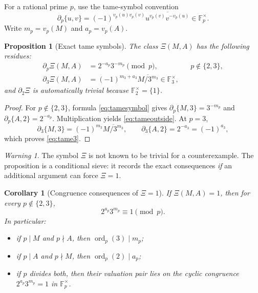 \documentclass[11pt]{article}
\numberwithin{equation}{section}
\newtheorem{proposition}[theorem]{Proposition}
\newtheorem{corollary}[theorem]{Corollary}
\theoremstyle{definition}
\theoremstyle{remark}
\newtheorem{warning}[theorem]{Warning}
\newcommand{\F}{\mathbb F}
\newcommand{\ord}{\operatorname{ord}}
\begin{document}
For a rational prime \(p\), use the tame-symbol convention
\begin{equation}
 \partial_p\{u,v\}
 =(-1)^{v_p(u)v_p(v)}
 \overline{u^{v_p(v)}v^{-v_p(u)}}
 \in\F_p^\times.\label{eq:tamesymbol}
\end{equation}
Write \(m_p=v_p(M)\) and \(a_p=v_p(A)\).

\begin{proposition}[Exact tame symbols]
\label{prop:tamesymbols}
The class \(\Xi(M,A)\) has the following residues:
\begin{align}
 \partial_p\Xi(M,A)
 &=2^{-a_p}3^{-m_p}\pmod p,
 &&p\notin\{2,3\},\label{eq:tameoutside}\\
 \partial_3\Xi(M,A)
 &=(-1)^{m_3+a_3}\overline{M/3^{m_3}}
 \in\F_3^\times,\label{eq:tame3}
\end{align}
and \(\partial_2\Xi\) is automatically trivial because \(\F_2^\times=\{1\}\).
\end{proposition}

\begin{proof}
For \(p\notin\{2,3\}\), formula \eqref{eq:tamesymbol} gives
\(\partial_p\{M,3\}=3^{-m_p}\) and
\(\partial_p\{A,2\}=2^{-a_p}\).  Multiplication yields
\eqref{eq:tameoutside}.  At \(p=3\),
\[
 \partial_3\{M,3\}=(-1)^{m_3}\overline{M/3^{m_3}},
 \qquad
 \partial_3\{A,2\}=2^{-a_3}=(-1)^{a_3},
\]
which proves \eqref{eq:tame3}.
\end{proof}

\begin{warning}
The symbol \(\Xi\) is not known to be trivial for a counterexample.  The proposition is a
conditional sieve: it records the exact consequences \emph{if} an additional argument can
force \(\Xi=1\).
\end{warning}

\begin{corollary}[Congruence consequences of \(\Xi=1\)]
\label{cor:K2sieve}
If \(\Xi(M,A)=1\), then for every \(p\notin\{2,3\}\),
\begin{equation}
 2^{a_p}3^{m_p}\equiv1\pmod p.\label{eq:K2congruence}
\end{equation}
In particular:
\begin{itemize}
\item if \(p\mid M\) and \(p\nmid A\), then \(\ord_p(3)\mid m_p\);
\item if \(p\mid A\) and \(p\nmid M\), then \(\ord_p(2)\mid a_p\);
\item if \(p\) divides both, then their valuation pair lies on the cyclic congruence
\(2^{a_p}3^{m_p}=1\) in \(\F_p^\times\).
\end{itemize}
\end{corollary}
\end{document}
